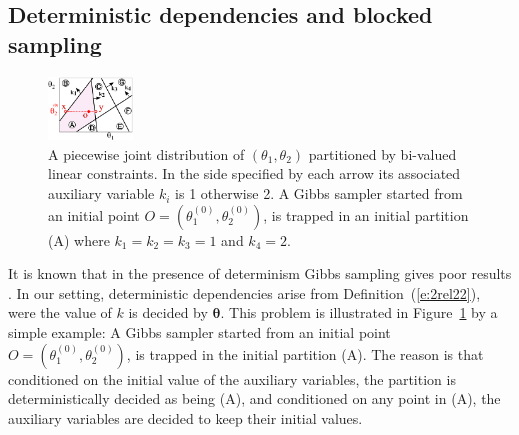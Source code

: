 \subsection{Deterministic dependencies and blocked sampling}
\label{sect:deterministic}
\begin{figure}
  \centering
  \includegraphics[width=0.20\textwidth]{pic/colxx.pdf}
\caption{\footnotesize
A piecewise joint distribution of $(\theta_1, \theta_2)$ partitioned by bi-valued linear constraints.
In the side specified by each arrow its associated auxiliary variable $k_i$ is 1 otherwise 2.
A Gibbs sampler started from an initial point $O = (\theta_1^{(0)}, \theta_2^{(0)})$, is trapped in an initial partition (A) 
where $k_1 = k_2 = k_3 = 1$ and $k_4 = 2$. 
}
\label{fig:simple.example}
\end{figure}
 It is known that in the presence of determinism Gibbs sampling gives poor results \cite{Poon:06}.
In our setting, deterministic dependencies arise from Definition~(\ref{e:2rel22}), were the value of $k$ is  decided by $\boldsymbol{\theta}$.
This problem is illustrated in Figure~\ref{fig:simple.example} by a simple example:
A Gibbs sampler started from an initial point $O=(\theta_1^{(0)}, \theta_2^{(0)})$, 
is trapped in the initial partition (A). 
The reason is that conditioned on the initial value of the auxiliary variables, the partition is deterministically decided as being (A), and conditioned on any point in (A), the auxiliary variables are decided to keep their initial values. %

